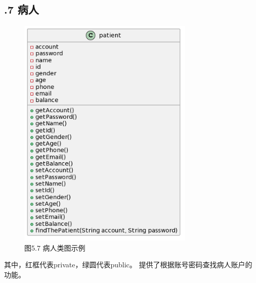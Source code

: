 \documentclass[24pt,a4paper]{article}%
\begin{document}
\subsection*{.7 病人}
\begin{figure}[H]
    \centering
    \includegraphics[width=0.75\textwidth]{images/patient.png}
    \caption*{图5.7 病人类图示例}
\end{figure}
其中，红框代表private，绿圆代表public。
提供了根据账号密码查找病人账户的功能。
\end{document}
